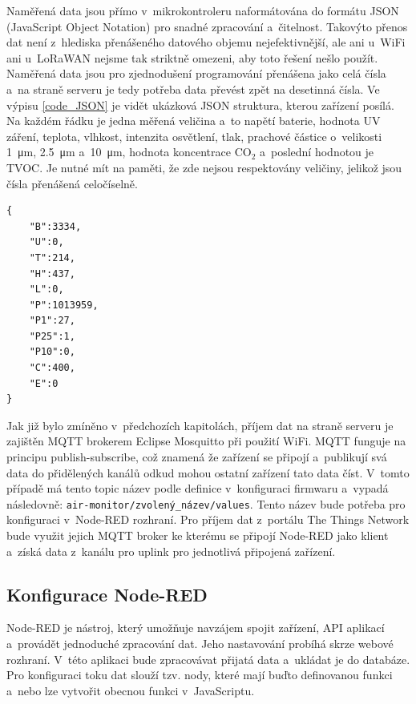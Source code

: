 Naměřená data jsou přímo v~mikrokontroleru naformátována do formátu JSON (JavaScript Object Notation) pro snadné zpracování a~čitelnost. Takovýto přenos dat není z~hlediska přenášeného datového objemu nejefektivnější, ale ani u~WiFi ani u~LoRaWAN nejsme tak striktně omezeni, aby toto řešení nešlo použít. Naměřená data jsou pro zjednodušení programování přenášena jako celá čísla a~na straně serveru je tedy potřeba data převést zpět na desetinná čísla. Ve výpisu \ref{code_JSON} je vidět ukázková JSON struktura, kterou zařízení posílá. Na každém řádku je jedna měřená veličina a~to napětí baterie, hodnota UV záření, teplota, vlhkost, intenzita osvětlení, tlak, prachové částice o~velikosti \SI{1}{\micro\metre}, \SI{2.5}{\micro\metre} a~\SI{10}{\micro\metre}, hodnota koncentrace CO$_2$ a~poslední hodnotou je TVOC. Je nutné mít na paměti, že zde nejsou respektovány veličiny, jelikož jsou čísla přenášená celočíselně.

\noindent
\begin{minipage}{\linewidth}
\begin{lstlisting}[caption={Příklad zasílané JSON zprávy.}, label={code_JSON}]
{
    "B":3334,
    "U":0,
    "T":214,
    "H":437,
    "L":0,
    "P":1013959,
    "P1":27,
    "P25":1,
    "P10":0,
    "C":400,
    "E":0
}
\end{lstlisting}
\end{minipage}

Jak již bylo zmíněno v~předchozích kapitolách, příjem dat na straně serveru je zajištěn MQTT brokerem Eclipse Mosquitto při použití WiFi. MQTT funguje na principu publish-subscribe, což znamená že zařízení se připojí a~publikují svá data do přidělených kanálů odkud mohou ostatní zařízení tato data číst. V~tomto případě má tento topic název podle definice v~konfiguraci firmwaru a~vypadá následovně: \lstinline{air-monitor/zvolený_název/values}. Tento název bude potřeba pro konfiguraci v~Node-RED rozhraní. Pro příjem dat z~portálu The Things Network bude využit jejich MQTT broker ke kterému se připojí Node-RED jako klient a~získá data z~kanálu pro uplink pro jednotlivá připojená zařízení.

\subsection{Konfigurace Node-RED}

Node-RED je nástroj, který umožňuje navzájem spojit zařízení, API aplikací a~provádět jednoduché zpracování dat. Jeho nastavování probíhá skrze webové rozhraní. V~této aplikaci bude zpracovávat přijatá data a~ukládat je do databáze. Pro konfiguraci toku dat slouží tzv. nody, které mají buďto definovanou funkci a~nebo lze vytvořit obecnou funkci v~JavaScriptu.

